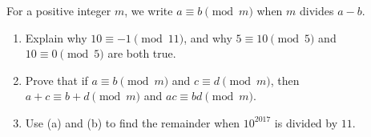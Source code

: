 For a positive integer $m$, we write $a\equiv b\pmod m$ when $m$ divides $a-b$.
\begin{enumerate}
\item[(a)] Explain why $10\equiv-1\pmod{11}$, and why $5\equiv10\pmod5$ and $10\equiv0\pmod5$ are both true.
\item[(b)] Prove that if $a\equiv b\pmod m$ and $c\equiv d\pmod m$, then $a+c\equiv b+d\pmod m$ and $ac\equiv bd\pmod m$.
\item[(c)] Use (a) and (b) to find the remainder when $10^{2017}$ is divided by $11$.
\end{enumerate}
